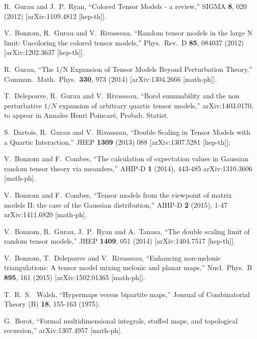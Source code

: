 \documentclass[aps,prd,10pt,notitlepage,nofootinbib,superscriptaddress,showkeys,showpacs]{revtex4-1}
\begin{document}
\begin{thebibliography}{99}

  R.~Gurau and J.~P.~Ryan,
  ``Colored Tensor Models - a review,''
  SIGMA {\bf 8}, 020 (2012)
  [arXiv:1109.4812 [hep-th]].
  
  V.~Bonzom, R.~Gurau and V.~Rivasseau,
  ``Random tensor models in the large N limit: Uncoloring the colored tensor models,''
  Phys.\ Rev.\ D {\bf 85}, 084037 (2012)
  [arXiv:1202.3637 [hep-th]].
  
  R.~Gurau,
  ``The 1/N Expansion of Tensor Models Beyond Perturbation Theory,''
  Commun.\ Math.\ Phys.\  {\bf 330}, 973 (2014)
  [arXiv:1304.2666 [math-ph]].
  
  T.~Delepouve, R.~Gurau and V.~Rivasseau,
 ``Borel summability and the non perturbative $1/N$ expansion of arbitrary quartic tensor models,''
  arXiv:1403.0170, to appear in Annales Henri Poincar\'e, Probab. Statist.
  
  S.~Dartois, R.~Gurau and V.~Rivasseau,
  ``Double Scaling in Tensor Models with a Quartic Interaction,''
  JHEP {\bf 1309} (2013) 088
  [arXiv:1307.5281 [hep-th]];
  
  V.~Bonzom and F.~Combes,
  ``The calculation of expectation values in Gaussian random tensor theory via meanders,''
  AHIP-D {\bf 1} (2014), 443-485  
  arXiv:1310.3606 [math-ph].

  V.~Bonzom and F.~Combes,
  ``Tensor models from the viewpoint of matrix models II: the case of the Gaussian distribution,''
  AIHP-D {\bf 2} (2015), 1-47 
  arXiv:1411.6820 [math-ph].

V.~Bonzom, R.~Gurau, J.~P.~Ryan and A.~Tanasa,
  ``The double scaling limit of random tensor models,''
  JHEP {\bf 1409}, 051 (2014)
  [arXiv:1404.7517 [hep-th]].
  
  V.~Bonzom, T.~Delepouve and V.~Rivasseau,
  ``Enhancing non-melonic triangulations: A tensor model mixing melonic and planar maps,''
  Nucl.\ Phys.\ B {\bf 895}, 161 (2015)
  [arXiv:1502.01365 [math-ph]].
  
  T.~R.~S.~ Walsh,
  ``Hypermaps versus bipartite maps,''
  Journal of Combinatorial Theory (B) {\bf 18}, 155-163 (1975). 

  G.~Borot,
  ``Formal multidimensional integrals, stuffed maps, and topological recursion,''
  arXiv:1307.4957 [math-ph].
  

\end{thebibliography}
\end{document}
